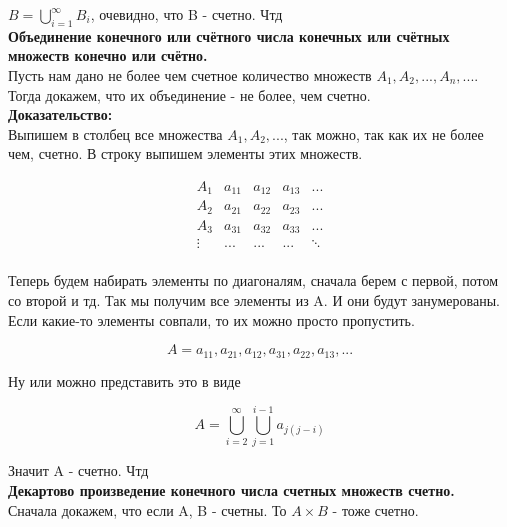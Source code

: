 $B = \bigcup\limits_{i = 1}^{\infty} B_i$, очевидно, что B - счетно. Чтд\\

\textbf{Объединение конечного или счётного числа конечных или счётных множеств конечно или счётно.}\\

Пусть нам дано не более чем счетное количество множеств $A_1, A_2, ..., A_n, ...$. Тогда докажем, что их объединение -
не более, чем счетно.\\

\noindent \textbf{Доказательство:}\\

Выпишем в столбец все множества $A_1, A_2, ...$, так можно, так как их не более чем, счетно. В строку выпишем элементы
этих множеств.

\begin{equation*}
    \begin{array}{c|cccc}
        A_1 & a_{11} & a_{12} & a_{13} & ...\\
        A_2 & a_{21} & a_{22} & a_{23} & ...\\
        A_3 & a_{31} & a_{32} & a_{33} & ...\\
        \vdots & ... & ... & ... & \ddots\\
    \end{array}
\end{equation*}

Теперь будем набирать элементы по диагоналям, сначала берем с первой, потом со второй и тд. Так мы получим все элементы из A.
И они будут занумерованы. Если какие-то элементы совпали, то их можно просто пропустить.

\begin{equation*}
    A = a_{11}, a_{21}, a_{12}, a_{31}, a_{22}, a_{13}, ...
\end{equation*}

Ну или можно представить это в виде

\begin{equation*}
    A = \bigcup\limits_{i = 2}^{\infty} \bigcup\limits_{j = 1}^{i - 1} a_{j (j - i)}
\end{equation*}

Значит A - счетно. Чтд\\

\textbf{Декартово произведение конечного числа счетных множеств счетно.}\\


Сначала докажем, что если A, B - счетны. То $A \times B$ - тоже счетно.\\

